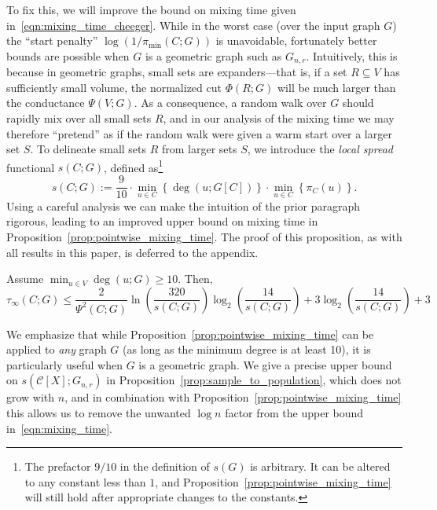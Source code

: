 \documentclass[11pt,twoside]{article}
\newcommand{\set}[1]{\left\{#1\right\}}
\newcommand{\1}{\mathbf{1}}
\newcommand{\mc}[1]{\mathcal{#1}}
\begin{document}
To fix this, we will improve the bound on mixing time given in~\eqref{eqn:mixing_time_cheeger}. While in the worst case (over the input graph $G$) the ``start penalty'' $\log(1/\pi_{\min}(C;G))$ is unavoidable, fortunately better bounds are possible when $G$ is a geometric graph such as $G_{n,r}$. Intuitively, this is because in geometric graphs, small sets are expanders---that is, if a set $R \subseteq V$ has sufficiently small volume, the normalized cut $\Phi(R;G)$ will be much larger than the conductance $\Psi(V; G)$. As a consequence, a random walk over $G$ should rapidly mix over all small sets $R$, and in our analysis of the mixing time we may therefore ``pretend'' as if the random walk were given a warm start over a larger set $S$. To delineate small sets $R$ from larger sets $S$, we introduce the \emph{local spread} functional $s(C; G)$, defined as\footnote{The prefactor $9/10$ in the definition of $s(G)$ is arbitrary. It can be altered to any constant less than $1$, and Proposition~\ref{prop:pointwise_mixing_time} will still hold after appropriate changes to the constants.}
\begin{equation*}
s(C; G) := \frac{9}{10} \cdot \min_{u \in C} \set{\deg(u; G[C])} \cdot \min_{u \in C} \set{\pi_C(u)}.
\end{equation*}
Using a careful analysis we can make the intuition of the prior paragraph rigorous, leading to an improved upper bound on mixing time in Proposition~\ref{prop:pointwise_mixing_time}. The proof of this proposition, as with all results in this paper, is deferred to the appendix.
\begin{proposition}
	\label{prop:pointwise_mixing_time}
	Assume $\min_{u \in V} \deg(u; G) \geq 10$. Then,
	\begin{equation}
	\label{eqn:pointwise_mixing_time}
	\tau_{\infty}(C; G) \leq \frac{2}{\Psi^2(C; G)} \ln \left(\frac{320}{s(C; G)}\right)\log_2 \left(\frac{14}{s(C; G)}\right)  + 3 \log_2 \left(\frac{14}{s(C; G)}\right) + 3
	\end{equation}
\end{proposition}

We emphasize that while Proposition~\ref{prop:pointwise_mixing_time} can be applied to \emph{any} graph $G$ (as long as the minimum degree is at least 10), it is particularly useful when $G$ is a geometric graph. We give a precise upper bound on $s(\mc{C}[X]; G_{n,r})$ in Proposition~\ref{prop:sample_to_population}, which does not grow with $n$, and in combination with Proposition~\ref{prop:pointwise_mixing_time} this allows us to remove the unwanted $\log n$ factor from the upper bound in~\eqref{eqn:mixing_time}. 
\end{document}
